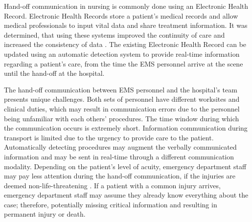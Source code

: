 \par Hand-off communication in nursing is commonly done using an Electronic Health Record. Electronic Health Records store a patient's medical records and allow medical professionals to input vital data and share treatment information. It was determined, that using these systems improved the continuity of care and increased the consistency of data \cite{COLLINS2011704}. The existing Electronic Health Record can be updated using an automatic detection system to provide real-time information regarding a patient's care, from the time the EMS personnel arrive at the scene until the hand-off at the hospital.
\par The hand-off communication between \gls{EMS} personnel and the hospital's team presents unique challenges. Both sets of personnel have different worksites and clinical duties, which may result in communication errors due to the personnel being unfamiliar with each others' procedures. The time window during which the communication occurs is extremely short. Information communication during transport is limited due to the urgency to provide care to the patient. Automatically detecting procedures may augment the verbally communicated information and may be sent in real-time through a different communication modality. Depending on the patient's level of acuity, emergency department staff may pay less attention during the hand-off communication, if the injuries are deemed non-life-threatening \cite{SoletDJNorvellJMRutanGH2005,Meisel2015}. If a patient with a common injury arrives, emergency department staff may assume they already know everything about the case; therefore, potentially missing critical information and resulting in permanent injury or death.

